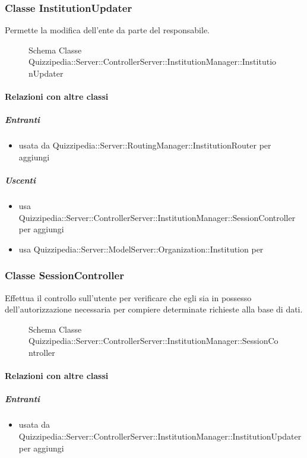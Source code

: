 \subsubsection{Classe InstitutionUpdater}
Permette la modifica dell'ente da parte del responsabile.
\begin{figure}[H]
\centering
\noindent{}
\caption[Schema Classe InstitutionUpdater]{Schema Classe Quizzipedia::Server::ControllerServer::InstitutionManager::InstitutionUpdater}
\end{figure}
\paragraph{Relazioni con altre classi}
\subparagraph{Entranti}
\begin{itemize}
\item usata da Quizzipedia::Server::RoutingManager::InstitutionRouter per aggiungi
\end{itemize}
\subparagraph{Uscenti}
\begin{itemize}
\item usa Quizzipedia::Server::ControllerServer::InstitutionManager::SessionController per aggiungi
\item usa Quizzipedia::Server::ModelServer::Organization::Institution per 
\end{itemize}
\subsubsection{Classe SessionController}
Effettua il controllo sull'utente per verificare che egli sia in possesso dell'autorizzazione necessaria per compiere determinate richieste alla base di dati.
\begin{figure}[H]
\centering
\noindent{}
\caption[Schema Classe SessionController]{Schema Classe Quizzipedia::Server::ControllerServer::InstitutionManager::SessionController}
\end{figure}
\paragraph{Relazioni con altre classi}
\subparagraph{Entranti}
\begin{itemize}
\item usata da Quizzipedia::Server::ControllerServer::InstitutionManager::InstitutionUpdater per aggiungi
\end{itemize}
